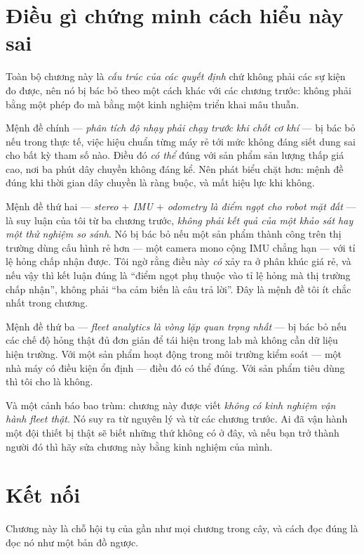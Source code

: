\documentclass[../../vslam.tex]{subfiles}
\begin{document}
\section{Điều gì chứng minh cách hiểu này sai}

Toàn bộ chương này là \emph{cấu trúc của các quyết định} chứ không phải các sự kiện đo được, nên nó bị bác bỏ theo một cách khác với các chương trước: không phải bằng một phép đo mà bằng một kinh nghiệm triển khai mâu thuẫn.

Mệnh đề chính --- \emph{phân tích độ nhạy phải chạy trước khi chốt cơ khí} --- bị bác bỏ nếu trong thực tế, việc hiệu chuẩn từng máy rẻ tới mức không đáng siết dung sai cho bất kỳ tham số nào. Điều đó \emph{có thể} đúng với sản phẩm sản lượng thấp giá cao, nơi ba phút dây chuyền không đáng kể. Nên phát biểu chặt hơn: mệnh đề đúng khi thời gian dây chuyền là ràng buộc, và mất hiệu lực khi không.

Mệnh đề thứ hai --- \emph{stereo \(+\) IMU \(+\) odometry là điểm ngọt cho robot mặt đất} --- là suy luận của tôi từ ba chương trước, \emph{không phải kết quả của một khảo sát hay một thử nghiệm so sánh}. Nó bị bác bỏ nếu một sản phẩm thành công trên thị trường dùng cấu hình rẻ hơn --- một camera mono cộng IMU chẳng hạn --- với tỉ lệ hỏng chấp nhận được. Tôi ngờ rằng điều này \emph{có} xảy ra ở phân khúc giá rẻ, và nếu vậy thì kết luận đúng là ``điểm ngọt phụ thuộc vào tỉ lệ hỏng mà thị trường chấp nhận'', không phải ``ba cảm biến là câu trả lời''. Đây là mệnh đề tôi ít chắc nhất trong chương.

Mệnh đề thứ ba --- \emph{fleet analytics là vòng lặp quan trọng nhất} --- bị bác bỏ nếu các chế độ hỏng thật đủ đơn giản để tái hiện trong lab mà không cần dữ liệu hiện trường. Với một sản phẩm hoạt động trong môi trường kiểm soát --- một nhà máy có điều kiện ổn định --- điều đó có thể đúng. Với sản phẩm tiêu dùng thì tôi cho là không.

Và một cảnh báo bao trùm: chương này được viết \emph{không có kinh nghiệm vận hành fleet thật}. Nó suy ra từ nguyên lý và từ các chương trước. Ai đã vận hành một đội thiết bị thật sẽ biết những thứ không có ở đây, và nếu bạn trở thành người đó thì hãy sửa chương này bằng kinh nghiệm của mình.

\section{Kết nối}

Chương này là chỗ hội tụ của gần như mọi chương trong cây, và cách đọc đúng là đọc nó như một bản đồ ngược.
\end{document}
